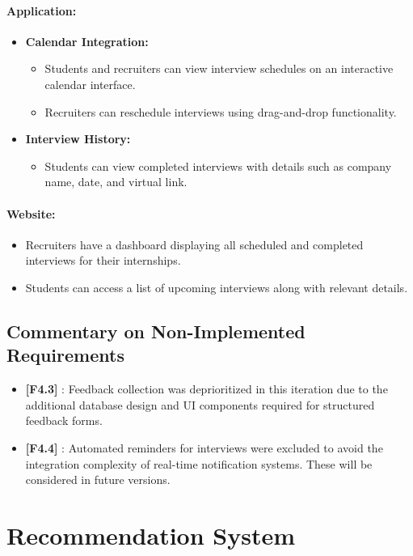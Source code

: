 \paragraph{Application:}
\begin{itemize}
    \item \textbf{Calendar Integration:}
    \begin{itemize}
        \item Students and recruiters can view interview schedules on an interactive calendar interface.
        \item Recruiters can reschedule interviews using drag-and-drop functionality.
    \end{itemize}
    \item \textbf{Interview History:}
    \begin{itemize}
        \item Students can view completed interviews with details such as company name, date, and virtual link.
    \end{itemize}
\end{itemize}

\paragraph{Website:}
\begin{itemize}
    \item Recruiters have a dashboard displaying all scheduled and completed interviews for their internships.
    \item Students can access a list of upcoming interviews along with relevant details.
\end{itemize}

\subsection*{Commentary on Non-Implemented Requirements}
\begin{itemize}
    \item \textbf{[F4.3]} : Feedback collection was deprioritized in this iteration due to the additional database design and UI components required for structured feedback forms.
    \item \textbf{[F4.4]} : Automated reminders for interviews were excluded to avoid the integration complexity of real-time notification systems. These will be considered in future versions.
\end{itemize}

\section{Recommendation System}
